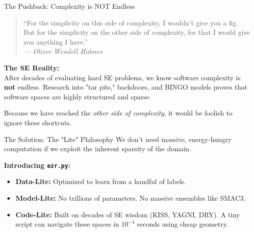 \begin{frame}{The Pushback: Complexity is NOT Endless}
  \vspace{0.3cm}
  \begin{quote}
  ``For the simplicity on this side of complexity, I wouldn't give you a fig. But for the simplicity on the other side of complexity, for that I would give you anything I have.'' \\
  \raggedleft \textit{--- Oliver Wendell Holmes}
  \end{quote}

  \vspace{0.4cm}
  \textbf{The SE Reality:} \\
  After decades of evaluating hard SE problems, we know software complexity is \textbf{not} endless. Research into "tar pits," backdoors, and BINGO models proves that software spaces are highly structured and sparse. 

  \vspace{0.2cm}
  Because we have reached the \textit{other side of complexity}, it would be foolish to ignore these shortcuts.
\end{frame}

\begin{frame}{The Solution: The "Lite" Philosophy}
  \vspace{0.3cm}
  We don't need massive, energy-hungry computation if we exploit the inherent sparsity of the domain. 

  \vspace{0.4cm}
  \textbf{Introducing \texttt{ezr.py}:}
  \begin{itemize}
      \item \textbf{Data-Lite:} Optimized to learn from a handful of labels.
      \item \textbf{Model-Lite:} No trillions of parameters. No massive ensembles like SMAC3.
      \item \textbf{Code-Lite:} Built on decades of SE wisdom (KISS, YAGNI, DRY). \pause A tiny script can navigate these spaces in $10^{-4}$ seconds using cheap geometry.
  \end{itemize}
\end{frame}
